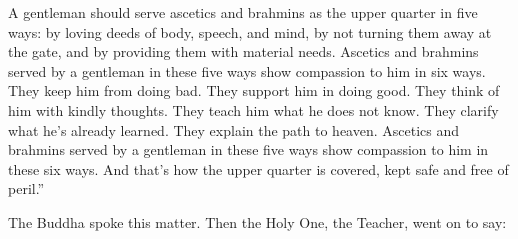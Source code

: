 \documentclass[12pt,openany]{book}%
\begin{document}
A gentleman should serve ascetics and brahmins as the upper quarter in five ways: by loving deeds of body, speech, and mind, by not turning them away at the gate, and by providing them with material needs. Ascetics and brahmins served by a gentleman in these five ways show compassion to him in six ways. They keep him from doing bad. They support him in doing good. They think of him with kindly thoughts. They teach him what he does not know. They clarify what he’s already learned. They explain the path to heaven. Ascetics and brahmins served by a gentleman in these five ways show compassion to him in these six ways. And that’s how the upper quarter is covered, kept safe and free of peril.” 

The Buddha spoke this matter. Then the Holy One, the Teacher, went on to say: 
\end{document}
